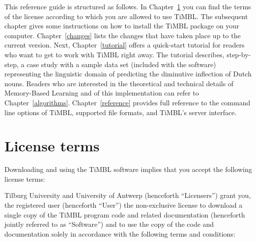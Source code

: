 \documentclass{report}
\begin{document}
This reference guide is structured as follows. In
Chapter~\ref{license} you can find the terms of the license according
to which you are allowed to use TiMBL. The subsequent chapter gives
some instructions on how to install the TiMBL package on your
computer. Chapter~\ref{changes} lists the changes that have taken
place up to the current version. Next, Chapter~\ref{tutorial} offers a
quick-start tutorial for readers who want to get to work with TiMBL
right away. The tutorial describes, step-by-step, a case study with a
sample data set (included with the software) representing the
linguistic domain of predicting the diminutive inflection of Dutch
nouns.  Readers who are interested in the theoretical and technical
details of Memory-Based Learning and of this implementation can refer
to Chapter~\ref{algorithms}. Chapter~\ref{reference} provides full
reference to the command line options of TiMBL, supported file
formats, and TiMBL's server interface.

\chapter{License terms}
\label{license}

Downloading and using the TiMBL software implies that you accept the
following license terms:

Tilburg University and University of Antwerp (henceforth
``Licensers'') grant you, the registered user (henceforth ``User'')
the non-exclusive license to download a single copy of the TiMBL
program code and related documentation (henceforth jointly referred to
as ``Software'') and to use the copy of the code and documentation
solely in accordance with the following terms and conditions:
\end{document}
